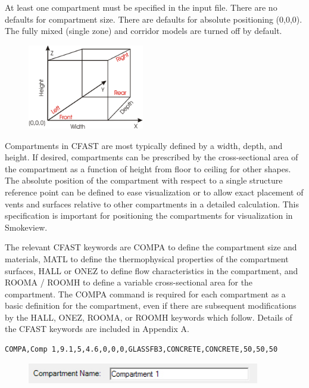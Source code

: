 At least one compartment must be specified in the input file.  There are no defaults for compartment size. There are defaults for absolute positioning (0,0,0). The fully mixed (single zone) and corridor models are turned off by default.

\begin{figure}
  \includegraphics[width=2.0in]{FIGURES/Input_File/CFAST_Coordinates}
\end{figure}

Compartments in CFAST are most typically defined by a width, depth, and height.  If desired, compartments can be prescribed by the cross-sectional area of the compartment as a function of height from floor to ceiling for other shapes. The absolute position of the compartment with respect to a single structure reference point can be defined to ease visualization or to allow exact placement of vents and surfaces relative to other compartments in a detailed calculation. This specification is important for positioning the compartments for visualization in Smokeview.

The relevant CFAST keywords are COMPA to define the compartment size and materials, MATL to define the thermophysical properties of the compartment surfaces, HALL or ONEZ to define flow characteristics in the compartment, and ROOMA / ROOMH to define a variable cross-sectional area for the compartment. The COMPA command is required for each compartment as a basic definition for the compartment, even if there are subsequent modifications by the HALL, ONEZ, ROOMA, or ROOMH keywords which follow.  Details of the CFAST keywords are included in Appendix A.

\begin{lstlisting}
COMPA,Comp 1,9.1,5,4.6,0,0,0,GLASSFB3,CONCRETE,CONCRETE,50,50,50
\end{lstlisting}

\begin{figure}[h!]
\begin{center}
\includegraphics[width=4.0in]{FIGURES/Input_File/Compartment_Name}
\end{center}
\end{figure}


